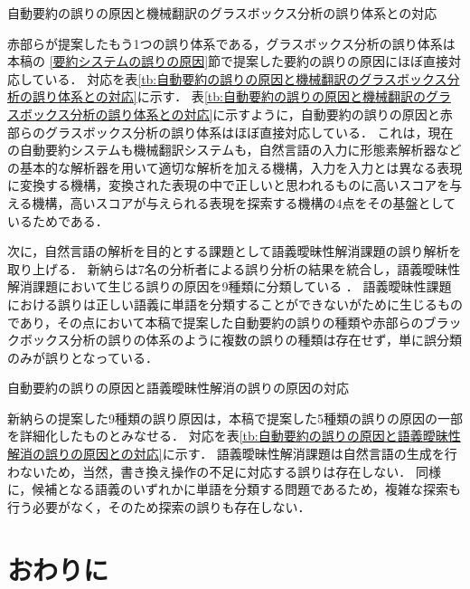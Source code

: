 \begin{table}[b]
\caption{自動要約の誤りの原因と機械翻訳のグラスボックス分析の誤り体系との対応}
\label{tb:自動要約の誤りの原因と機械翻訳のグラスボックス分析の誤り体系との対応}

\end{table}

赤部らが提案したもう1つの誤り体系である，グラスボックス分析の誤り体系は本稿の
\ref{要約システムの誤りの原因}節で提案した要約の誤りの原因にほぼ直接対応している．
対応を表\ref{tb:自動要約の誤りの原因と機械翻訳のグラスボックス分析の誤り体系との対応}に示す．
表\ref{tb:自動要約の誤りの原因と機械翻訳のグラスボックス分析の誤り体系との対応}に示すように，自動要約の誤りの原因と赤部らのグラスボックス分析の誤り体系はほぼ直接対応している．
これは，現在の自動要約システムも機械翻訳システムも，自然言語の入力に形態素解析器などの基本的な解析器を用いて適切な解析を加える機構，入力を入力とは異なる表現に変換する機構，変換された表現の中で正しいと思われるものに高いスコアを与える機構，高いスコアが与えられる表現を探索する機構の4点をその基盤としているためである．

次に，自然言語の解析を目的とする課題として語義曖昧性解消課題の誤り解析を取り上げる．
新納らは7名の分析者による誤り分析の結果を統合し，語義曖昧性解消課題において生じる誤りの原因を9種類に分類している
\cite{shinnou15}
．
語義曖昧性課題における誤りは正しい語義に単語を分類することができないがために生じるものであり，その点において本稿で提案した自動要約の誤りの種類や赤部らのブラックボックス分析の誤りの体系のように複数の誤りの種類は存在せず，単に誤分類のみが誤りとなっている．

\begin{table}[t]
\caption{自動要約の誤りの原因と語義曖昧性解消の誤りの原因の対応}
\label{tb:自動要約の誤りの原因と語義曖昧性解消の誤りの原因との対応}

\end{table}

新納らの提案した9種類の誤り原因は，本稿で提案した5種類の誤りの原因の一部を詳細化したものとみなせる．
対応を表\ref{tb:自動要約の誤りの原因と語義曖昧性解消の誤りの原因との対応}に示す．
語義曖昧性解消課題は自然言語の生成を行わないため，当然，書き換え操作の不足に対応する誤りは存在しない．
\pagebreak
同様に，候補となる語義のいずれかに単語を分類する問題であるため，複雑な探索も行う必要がなく，そのため探索の誤りも存在しない．


\section{おわりに}
\label{sc:おわりに}

